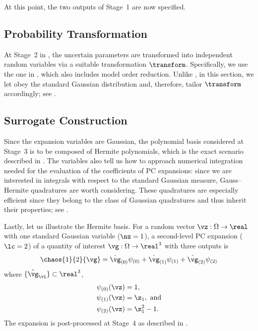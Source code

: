 At this point, the two outputs of Stage~1 are now specified.

\subsection{Probability Transformation}

At Stage~2 in , the uncertain parameters \vu are
transformed into independent random variables \vz via a suitable transformation
$\transform$. Specifically, we use the one in ,
which also includes model order reduction. Unlike
, in this section, we let \vz obey the
standard Gaussian distribution and, therefore, tailor $\transform$ accordingly;
see .

\subsection{Surrogate Construction}

Since the expansion variables \vz are Gaussian, the polynomial basis considered
at Stage~3 is to be composed of Hermite polynomials, which is the exact scenario
described in . The variables also tell us how to approach
numerical integration needed for the evaluation of the coefficients of \ac{PC}
expansions: since we are interested in integrals with respect to the standard
Gaussian measure, Gauss--Hermite quadratures \cite{maitre2010} are worth
considering. These quadratures are especially efficient since they belong to the
class of Gaussian quadratures and thus inherit their properties; see
.

Lastly, let us illustrate the Hermite basis. For a random vector $\vz: \Omega
\to \real$ with one standard Gaussian variable ($\nz = 1$), a second-level
\ac{PC} expansion ($\lc = 2$) of a quantity of interest $\vg: \Omega \to
\real^3$ with three outputs is
\[
  \chaos{1}{2}{\vg}
  = \hat{\vg}_{(0)} \psi_{(0)}
  + \hat{\vg}_{(1)} \psi_{(1)}
  + \hat{\vg}_{(2)} \psi_{(2)}
\]
where $\{ \hat{\vg}_{\vi} \} \subset \real^3$,
\begin{align*}
  & \psi_{(0)}(\vz) = 1, \\
  & \psi_{(1)}(\vz) = \z_1, \text{ and} \\
  & \psi_{(2)}(\vz) = \z_1^2 - 1.
\end{align*}
The expansion is post-processed at Stage~4 as described in
.
